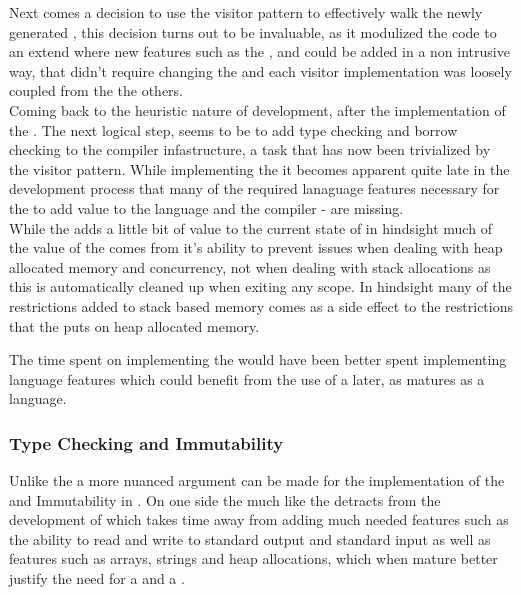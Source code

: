 Next comes a decision to use the visitor pattern to effectively walk the newly
generated \ast{}, this decision turns out to be invaluable, as it modulized the code
to an extend where new features such as the \typeChecker, \borrowChecker{} and
\codeGen{} could be added in a non intrusive way, that didn't require changing the
\ast{} and each visitor implementation was loosely coupled from the the others. \\

Coming back to the heuristic nature of development, after the implementation of the
\codeGen. The next logical step, seems to be to add type checking and borrow checking
to the compiler infastructure, a task that has now been trivialized by the visitor
pattern. While implementing the \borrowChecker{} it becomes apparent quite late in
the development process that many of the required lanaguage features necessary for
the \borrowChecker{} to add value to the language and the compiler - are missing. \\

While the \borrowChecker{} adds a little bit of value to the current state of \lang{}
in hindsight much of the value of the \borrowChecker{} comes from it's ability to
prevent issues when dealing with heap allocated memory and concurrency, not when
dealing with stack allocations as this is automatically cleaned up when exiting any
scope. In hindsight many of the restrictions added to stack based memory comes as a side
effect to the restrictions that the \borrowChecker{} puts on heap allocated memory. 

The time spent on implementing the \borrowChecker{} would have been better
spent implementing language features which could benefit from the use of a
\borrowChecker{} later, as \lang{} matures as a language.


\subsubsection{Type Checking and Immutability}

Unlike the \borrowChecker{} a more nuanced argument can be made for the
implementation of the \typeChecker{} and Immutability in \lang. On one side the
\typeChecker{} much like the \borrowChecker{} detracts from the development of
\lang{} which takes time away from adding much needed features such as the ability
to read and write to standard output and standard input as well as features such as
arrays, strings and heap allocations, which when mature better justify the need for a
\typeChecker{} and a \borrowChecker. \\ 

